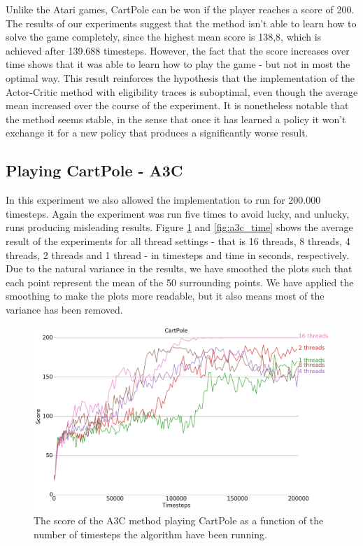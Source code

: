 \documentclass[11pt]{article}
\begin{document}
Unlike the Atari games, CartPole can be won if the player reaches a score of 200.
The results of our experiments suggest that
the method isn't able to learn how to solve the game completely,
since the highest mean score is 138,8, which is achieved after 139.688 timesteps.
However, the fact that the score increases over time
shows that it was able to learn how to play the game -
but not in most the optimal way.
This result reinforces the hypothesis that the implementation of the
Actor-Critic method with eligibility traces is suboptimal, even
though the average mean increased over the course of the experiment.
It is nonetheless notable that the method seems stable, in the sense that once it has learned
a policy it won't exchange it for a new policy that produces a significantly worse result.


\subsection{Playing CartPole - A3C}

In this experiment we also allowed the implementation to run for
200.000 timesteps.
Again the experiment was run five times to avoid lucky, and unlucky, runs
producing misleading results.
Figure \ref{fig:a3c_time_steps} and \ref{fig:a3c_time} shows the average result of the experiments for all thread settings - that is 16 threads, 8 threads, 4 threads,
2 threads and 1 thread - in timesteps and time in seconds, respectively.
Due to the natural variance in the results, 
we have smoothed the plots such that each point represent the mean of the 50
surrounding points.
We have applied the smoothing to make the plots more readable,
but it also means most of the variance has been removed.

\begin{figure}[H]
    \centering
    \includegraphics[scale=0.4]{plots/cartpole_compare_counter_without_AC.png}
    \caption{The score of the A3C method playing CartPole as a function
    of the number of timesteps the algorithm have been running.}
    \label{fig:a3c_time_steps}
\end{figure}
\end{document}

